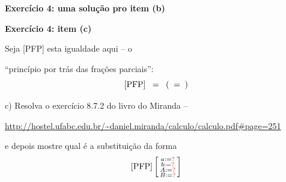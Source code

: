 \documentclass[oneside,12pt]{article}
\begin{document}
\newpage


{\bf Exercício 4: uma solução pro item (b)}







\newpage


{\bf Exercício 4: item (c)}

Seja [PFP] esta igualdade aqui -- o

``princípio por trás das frações parciais'':
%
$$\text{[PFP]} \;\;=\;\;
  \left(\ga{f1} \;\;=\;\; \ga{f1.6}
  \right)
$$

\msk

c) Resolva o exercício 8.7.2 do livro do Miranda --

\ssk

{\scriptsize

\url{http://hostel.ufabc.edu.br/~daniel.miranda/calculo/calculo.pdf#page=251}

}

\ssk

\def\rq{\ColorRed{?}}

e depois mostre qual é a substituição da forma
%
$$\text{[PFP]} \bsm{a:=\rq \\ b:=\rq \\ A:=\rq \\ B:=\rq}
$$
\end{document}
